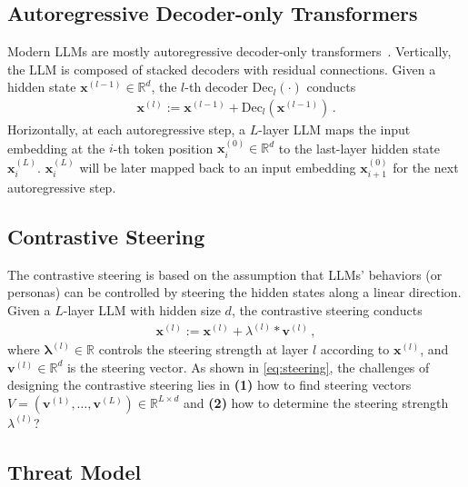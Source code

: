 \documentclass{article}
\theoremstyle{plain}
\theoremstyle{definition}
\theoremstyle{remark}
\begin{document}
\subsection{Autoregressive Decoder-only Transformers}

Modern LLMs are mostly autoregressive decoder-only transformers~\cite{transformer}. Vertically, the LLM is composed of stacked decoders with residual connections. Given a hidden state $\mathbf{x}^{(l-1)} \in \mathbb{R}^{d}$, the $l$-th decoder $\text{Dec}_{l}(\cdot)$ conducts
\begin{align}
	\mathbf{x}^{(l)} := \mathbf{x}^{(l-1)} + \text{Dec}_{l}(\mathbf{x}^{(l-1)})\,.\label{eq:decoder}
\end{align}
Horizontally, at each autoregressive step, a $L$-layer LLM maps the input embedding at the $i$-th token position $\mathbf{x}^{(0)}_{i} \in \mathbb{R}^{d}$ to the last-layer hidden state $\mathbf{x}^{(L)}_{i}$. $\mathbf{x}^{(L)}_{i}$ will be later mapped back to an input embedding $\mathbf{x}^{(0)}_{i+1}$ for the next autoregressive step.

\subsection{Contrastive Steering}\label{sec:briefSteering}

The contrastive steering is based on the assumption that LLMs' behaviors (or personas) can be controlled by steering the hidden states along a linear direction. Given a $L$-layer LLM with hidden size $d$, the contrastive steering conducts
\begin{align}
	\mathbf{x}^{(l)} := \mathbf{x}^{(l)} + \lambda^{(l)} * \mathbf{v}^{(l)}\,,\label{eq:steering}
\end{align}
where $\mathbf{\lambda}^{(l)} \in \mathbb{R}$ controls the steering strength at layer $l$ according to $\mathbf{x}^{(l)}$, and $\mathbf{v}^{(l)} \in \mathbb{R}^{d}$ is the steering vector. As shown in \cref{eq:steering}, the challenges of designing the contrastive steering lies in \textbf{(1)} how to find steering vectors $V = (\mathbf{v}^{(1)}, \dots, \mathbf{v}^{(L)}) \in \mathbb{R}^{L \times d}$ and \textbf{(2)} how to determine the steering strength $\lambda^{(l)}$?




\subsection{Threat Model}\label{sec:threatModel}
\end{document}
